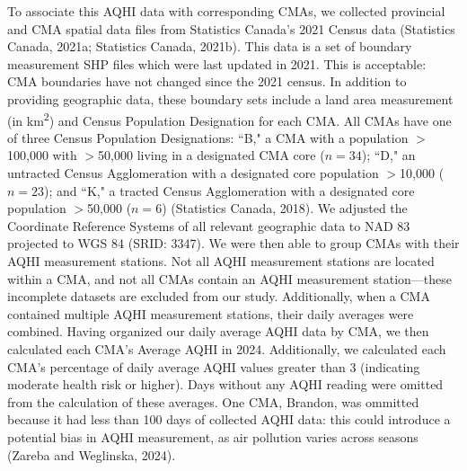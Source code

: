 \documentclass[AEJ]{AEA}
\begin{document}
To associate this AQHI data with corresponding CMAs, we collected provincial and 
CMA spatial data files from Statistics Canada's 2021 Census data 
(Statistics Canada, 2021a; Statistics Canada, 2021b). This data is a set of boundary measurement 
SHP files which were last updated in 2021.
This is acceptable: CMA boundaries have not changed since the 2021 census.
In addition to providing geographic data, these boundary sets include a 
land area measurement (in km\textsuperscript{2}) and Census 
Population Designation for each CMA. All CMAs have one of three
Census Population Designations: ``B," a CMA with a population $>$100,000 with $>$50,000
living in a designated CMA core ($n = 34$); ``D," an untracted Census Agglomeration with a designated core
population $>$10,000 ($n = 23$); and ``K," a tracted Census Agglomeration with a designated core
population $>$50,000 ($n = 6$) (Statistics Canada, 2018).
We adjusted the Coordinate Reference Systems of all relevant geographic data to NAD 83 projected
to WGS 84 (SRID: 3347). We were then able to group CMAs 
with their AQHI measurement stations. Not all AQHI 
measurement stations are located within a CMA, and not all CMAs contain an AQHI
measurement station—these incomplete datasets are excluded from our study. 
Additionally, when a CMA contained multiple AQHI measurement stations, their
daily averages were combined. Having organized our daily average 
AQHI data by CMA, we then calculated each CMA's Average AQHI in 2024. Additionally,
we calculated each CMA's percentage of daily average AQHI values greater than 3 (indicating moderate health risk or higher).
Days without any AQHI reading were omitted from the calculation of these averages. 
One CMA, Brandon, was ommitted because it had less than 100 days of collected 
AQHI data: this could introduce a potential bias in AQHI measurement, as air pollution varies
across seasons (Zareba and Weglinska, 2024).
\end{document}
